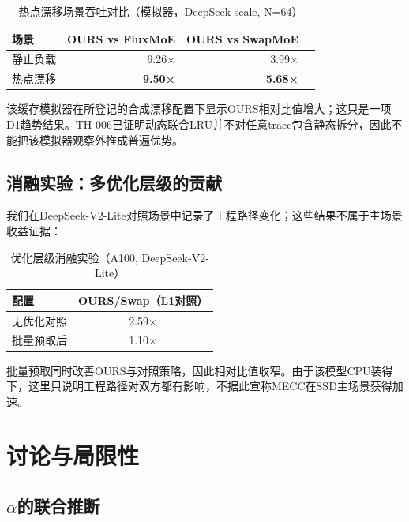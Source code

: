 \documentclass[11pt,a4paper]{article}
\begin{document}
\begin{table}[!h]
\centering
\caption{热点漂移场景吞吐对比（模拟器，DeepSeek scale, N=64）}
\label{tab:drift}
\begin{tabular}{lrrr}
\toprule
\textbf{场景} & \textbf{OURS vs FluxMoE} & \textbf{OURS vs SwapMoE} \\
\midrule
静止负载 & 6.26× & 3.99× \\
热点漂移 & \textbf{9.50×} & \textbf{5.68×} \\
\bottomrule
\end{tabular}
\end{table}

该缓存模拟器在所登记的合成漂移配置下显示OURS相对比值增大；这只是一项D1趋势结果。TH-006已证明动态联合LRU并不对任意trace包含静态拆分，因此不能把该模拟器观察外推成普遍优势。

\subsection{消融实验：多优化层级的贡献}

我们在DeepSeek-V2-Lite对照场景中记录了工程路径变化；这些结果不属于主场景收益证据：

\begin{table}[!h]
\centering
\caption{优化层级消融实验（A100, DeepSeek-V2-Lite）}
\label{tab:ablation}
\begin{tabular}{lc}
\toprule
\textbf{配置} & \textbf{OURS/Swap（L1对照）} \\
\midrule
无优化对照 & 2.59× \\
批量预取后 & 1.10× \\
\bottomrule
\end{tabular}
\end{table}

批量预取同时改善OURS与对照策略，因此相对比值收窄。由于该模型CPU装得下，这里只说明工程路径对双方都有影响，不据此宣称MECC在SSD主场景获得加速。

\section{讨论与局限性}

\subsection{$\alpha$的联合推断}
\end{document}
